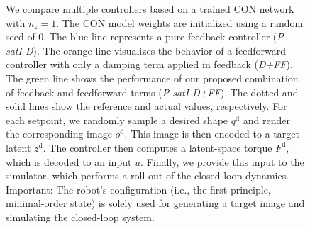 \begin{figure}[ht]
{    We compare multiple controllers based on a trained \gls{CON} network with $n_z=1$. The \gls{CON} model weights are initialized using a random seed of 0.
    The blue line represents a pure feedback controller (\emph{P-satI-D}). The orange line visualizes the behavior of a feedforward controller with only a damping term applied in feedback (\emph{D+FF}). The green line shows the performance of our proposed combination of feedback and feedforward terms (\emph{P-satI-D+FF}).
    The dotted and solid lines show the reference and actual values, respectively.
    For each setpoint, we randomly sample a desired shape $q^\mathrm{d}$ and render the corresponding image $o^\mathrm{d}$. This image is then encoded to a target latent $z^\mathrm{d}$. The controller then computes a latent-space torque $F^\mathrm{d}$, which is decoded to an input $u$. Finally, we provide this input to the simulator, which performs a roll-out of the closed-loop dynamics.
    Important: The robot's configuration (i.e., the first-principle, minimal-order state) is solely used for generating a target image and simulating the closed-loop system. 
    }\label{fig:con:control:m-sp+f+a:sequences_comparison}
\end{figure}

